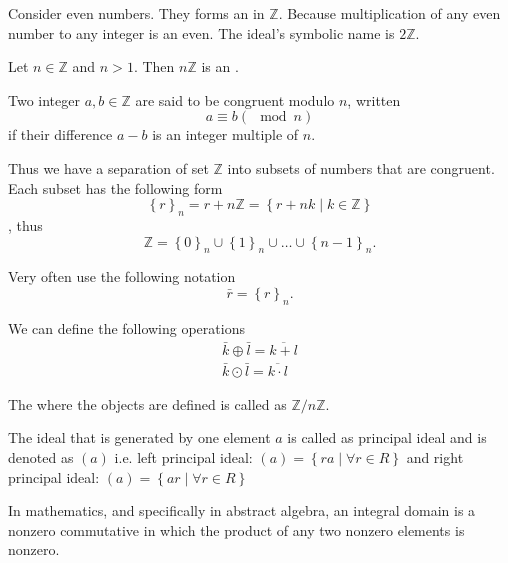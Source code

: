 \begin{example}
  Consider even numbers. They forms an  in
  $\mathbb{Z}$. Because multiplication of any even number to any
  integer is an even. The ideal's symbolic name is $2 \mathbb{Z}$.
  \label{ex:ideal}
\end{example}

\begin{example}
  Let $n \in \mathbb{Z}$ and $n > 1$. Then $n \mathbb{Z}$ is an
  .

  Two integer $a, b \in \mathbb{Z}$  are said to be congruent modulo
  $n$, written
  \[
  a \equiv b ( \mod n )
  \]
  if their difference $a - b$ is an integer multiple of $n$.

  Thus we have a separation of set $\mathbb{Z}$ into subsets of
  numbers that are congruent. Each subset has the following form
  \[
  \left\{r\right\}_n = r + n \mathbb{Z} =
  \left\{r + n k \mid k \in \mathbb{Z}\right\}
  \],
  thus
  \[
  \mathbb{Z} = \left\{0\right\}_n \cup \left\{1\right\}_n
  \cup \dots \cup \left\{n-1\right\}_n.
  \]

  Very often use the following notation
  \[
  \bar{r} = \left\{r\right\}_n.
  \]

  We can define the following operations
  \begin{eqnarray}
    \bar{k} \oplus \bar{l} = \overline{k + l}
    \nonumber \\
    \bar{k} \odot \bar{l} = \overline{k \cdot l}
    \nonumber
  \end{eqnarray}
  
  The  where the objects are defined is called as
  $\mathbb{Z}/n\mathbb{Z}$.
  \label{ex:intmodulo}
\end{example}

\begin{definition}
  The ideal that is generated by one element $a$ is called as
  principal ideal and is denoted as $\left(a\right)$ i.e.
  left principal ideal:
  $\left(a\right) = \left\{r a \mid \forall r \in R\right\}$ and
  right principal ideal:
  $\left(a\right) = \left\{a r \mid \forall r \in R\right\}$
  \label{def:prinicipalideal}
\end{definition}

\begin{definition}
In mathematics, and specifically in abstract algebra, an integral
domain is a nonzero commutative  in which the
product of any two nonzero elements is nonzero.
\label{def:integraldomain}
\end{definition}

